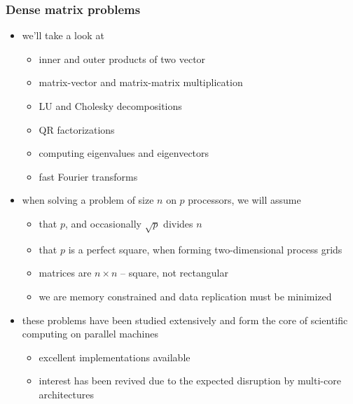 %
%
%
%


\begin{frame}[fragile]
%
  \frametitle{Dense matrix problems}
%
  \begin{itemize}
%
  \item we'll take a look at
    \begin{itemize}
    \item inner and outer products of two vector
    \item matrix-vector and matrix-matrix multiplication
    \item LU and Cholesky decompositions
    \item QR factorizations
    \item computing eigenvalues and eigenvectors
    \item fast Fourier transforms
    \end{itemize}
%
  \item when solving a problem of size $n$ on $p$ processors, we will assume
    \begin{itemize}
    \item that $p$, and occasionally $\sqrt{p}$ divides $n$
    \item that $p$ is a perfect square, when forming two-dimensional process grids
    \item matrices are $n\times n$ -- square, not rectangular
    \item we are memory constrained and data replication must be minimized
    \end{itemize}
%
    \item these problems have been studied extensively and form the core of scientific
      computing on parallel machines
      \begin{itemize}
      \item excellent implementations available 
      \item interest has been revived due to the expected disruption by multi-core
        architectures
      \end{itemize}
%
  \end{itemize}
%
\end{frame}

